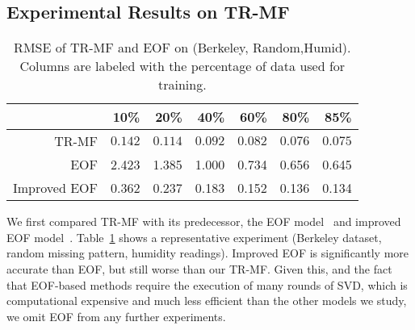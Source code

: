 \subsection{Experimental Results on TR-MF} \label{subsec:exp_basic}%



\begin{table}[h]
\setlength{\tabcolsep}{2pt}
\small
\centering
\caption{RMSE of TR-MF and EOF on (Berkeley, Random,Humid).  Columns are labeled with the percentage of data used for training.}
\label{table:trmf_eof}
\begin{tabular}{ r | r r r r r r}
		&10\%	&20\%	&40\%	&60\%	&80\% &85\%\\ 
	 \hline
	 TR-MF &$\mathbf{0.142}$ &$\mathbf{0.114}$ &$\mathbf{0.092}$ &$\mathbf{0.082}$ &$\mathbf{0.076}$  &$\mathbf{0.075}$\\
     	 EOF &2.423 &1.385 &1.000 &0.734 &0.656 &0.645\\
     Improved EOF & 0.362 & 0.237 & 0.183 & 0.152 & 0.136 & 0.134\\
\end{tabular}
\vspace{-0.5cm}
\end{table}


We first compared TR-MF with its predecessor, the EOF model~\cite{beckers2003eof} and improved EOF model~\cite{kondrashov2006spatio}.
Table~\ref{table:trmf_eof} shows a representative experiment (Berkeley dataset, random missing pattern, humidity readings).
Improved EOF is significantly more accurate than EOF, but still worse than our TR-MF.
Given this, and the fact that EOF-based methods require the execution of many rounds of SVD, 
which is computational expensive and much less efficient than the other models we study, 
we omit EOF from any further experiments.

